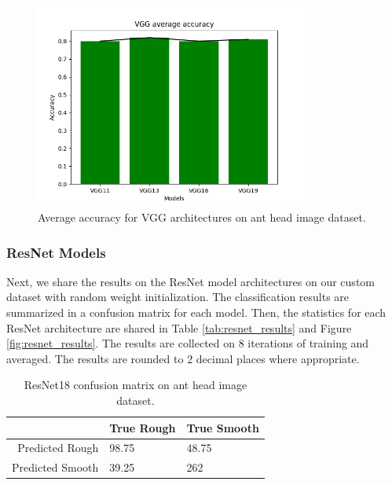 \documentclass[12pt]{article}
\begin{document}
\begin{figure}[h]
    \centering
    \includegraphics[width=0.8\textwidth]{assets/plots/vgg_average.png}
    \caption{Average accuracy for VGG architectures on ant head image dataset.}
    \label{fig:vgg_results}
\end{figure}

\clearpage
\subsubsection{ResNet Models}

Next, we share the results on the ResNet model architectures on our custom
dataset with random weight initialization. The classification results are
summarized in a confusion matrix for each model. Then, the statistics for each
ResNet architecture are shared in Table \ref{tab:resnet_results} and Figure
\ref{fig:resnet_results}. The results are collected on 8 iterations of training and
averaged. The results are rounded to 2 decimal places where appropriate.

\vspace{0.5in}

\begin{table}[h]
    \centering
    \caption{ResNet18 confusion matrix on ant head image dataset.}
    \begin{tabular}{r|ll}
                         & True Rough & True Smooth \\
        \hline
        Predicted Rough  & 98.75      & 48.75       \\
        Predicted Smooth & 39.25      & 262         \\
    \end{tabular}
    \label{tab:resnet18_confusion_matrix}
\end{table}
\end{document}
